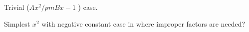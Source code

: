 \documentclass[12pt, a4paper, addpoints]{exam}
\begin{document}
\begin{questions}
\begin{multicols}{3}
\begin{parts}
\end{parts}
\end{multicols}
\vspace{25mm}

\question Trivial  ($Ax^2 /pm Bx -1$ )   case.
\setlength{\columnsep}{20pt}
\begin{multicols}{3}
\end{multicols}
\newpage

















\question Simplest  $x^2$ with negative constant case in where improper factors are needed? 
\setlength{\columnsep}{20pt}
\begin{multicols}{3}
\end{multicols}
\end{questions}
\end{document}
